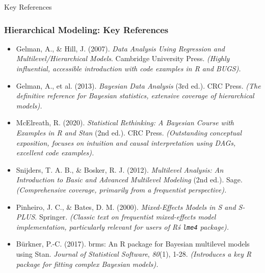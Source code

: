 \documentclass[aspectratio=169]{beamer}
\begin{document}
\begin{frame}[allowframebreaks]{Key References}
    \frametitle{Hierarchical Modeling: Key References}
    \footnotesize
    \begin{itemize}
        \item Gelman, A., \& Hill, J. (2007). \textit{Data Analysis Using Regression and Multilevel/Hierarchical Models}. Cambridge University Press. \textit{(Highly influential, accessible introduction with code examples in R and BUGS).}
        \item Gelman, A., et al. (2013). \textit{Bayesian Data Analysis} (3rd ed.). CRC Press. \textit{(The definitive reference for Bayesian statistics, extensive coverage of hierarchical models).}
        \item McElreath, R. (2020). \textit{Statistical Rethinking: A Bayesian Course with Examples in R and Stan} (2nd ed.). CRC Press. \textit{(Outstanding conceptual exposition, focuses on intuition and causal interpretation using DAGs, excellent code examples).}
        \item Snijders, T. A. B., \& Bosker, R. J. (2012). \textit{Multilevel Analysis: An Introduction to Basic and Advanced Multilevel Modeling} (2nd ed.). Sage. \textit{(Comprehensive coverage, primarily from a frequentist perspective).}
        \item Pinheiro, J. C., \& Bates, D. M. (2000). \textit{Mixed-Effects Models in S and S-PLUS}. Springer. \textit{(Classic text on frequentist mixed-effects model implementation, particularly relevant for users of R\'s \texttt{lme4} package).}
        \item B\"urkner, P.-C. (2017). brms: An R package for Bayesian multilevel models using Stan. \textit{Journal of Statistical Software}, \textit{80}(1), 1-28. \textit{(Introduces a key R package for fitting complex Bayesian models).}
    \end{itemize}
\end{frame}

\maketitle
\end{document}
